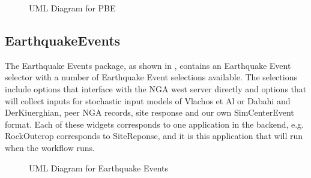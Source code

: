  \begin{figure}[!htbp]
  \caption{UML Diagram for PBE}
  \label{fig:umlPBE}
\end{figure}
 

\subsection{EarthquakeEvents}
 The Earthquake Events package, as shown in , contains an Earthquake Event selector with a number of Earthquake Event selections available. The selections include options that interface with the NGA west server directly and options that will collect inputs for stochastic input models of Vlachos et Al or Dabahi and DerKiuerghian, peer NGA records, site response and our own SimCenterEvent format. Each of these widgets corresponds to one application in the backend, e.g. RockOutcrop corresponds to SiteReponse, and it is this application that will run when the workflow runs.

 
 \begin{figure}[!htbp]
  \caption{UML Diagram for Earthquake Events}
  \label{fig:umlEarthquakeEvents}
\end{figure}
 
